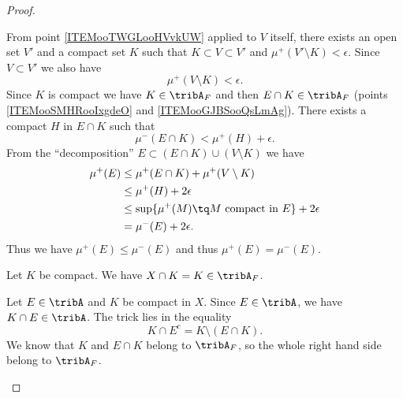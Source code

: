 \begin{proof}
\begin{subproof}
		From point \ref{ITEMooTWGLooHVvkUW} applied to \( V\) itself, there exists an open set \( V' \) and a compact set \( K\) such that \( K\subset V\subset V'\) and \( \mu^+(V'\setminus K)<\epsilon\). Since \( V\subset V'\) we also have
		\begin{equation}
			\mu^+(V\setminus K)<\epsilon.
		\end{equation}
		Since \( K\) is compact we have \( K\in \tribA_F\) and then \( E\cap K\in\tribA_F\) (points \ref{ITEMooSMHRooIxgdeO} and \ref{ITEMooGJBSooQsLmAg}). There exists a compact \( H\) in \( E\cap K\) such that
		\begin{equation}
			\mu^-(E\cap K)<\mu^+(H)+\epsilon.
		\end{equation}
		From the ``decomposition'' \( E\subset (E\cap K)\cup(V\setminus K)\) we have
		\begin{subequations}
			\begin{align}
				\mu^+(E) & \leq \mu^+(E\cap K)+\mu^+(V\setminus K)                              \\
				         & \leq \mu^+(H)+2\epsilon                                              \\
				         & \leq \sup\{ \mu^+(M)\tq \text{\( M\) compact in \( E\)} \}+2\epsilon \\
				         & =\mu^-(E)+2\epsilon.
			\end{align}
		\end{subequations}
		Thus we have \( \mu^+(E)\leq \mu^-(E)\) and thus \( \mu^+(E)=\mu^-(E)\).

		\spitem[\( X\in\tribA\)]        \label{ITEMooOQZLooMqPYTP}

		Let \( K\) be compact. We have \( X\cap K=K\in \tribA_F\).

		       \label{ITEMooCJRFooJAEZIV}

		Let \( E\in \tribA\) and \( K\) be compact in \( X\). Since \( E\in\tribA\), we have \( K\cap E\in\tribA\). The trick lies in the equality
		\begin{equation}
			K\cap E^c=K\setminus(E\cap K).
		\end{equation}
		We know that  \( K\) and \( E\cap K\) belong to \( \tribA_F\), so the whole right hand side belong to \( \tribA_F\).

		\spitem[If \( A_k\in \tribA\), then \(A= \bigcup_{k=1}^{\infty}A_k\in\tribA\)]      \label{ITEMooUGTIooWqVFIo}


\end{subproof}
\end{proof}
